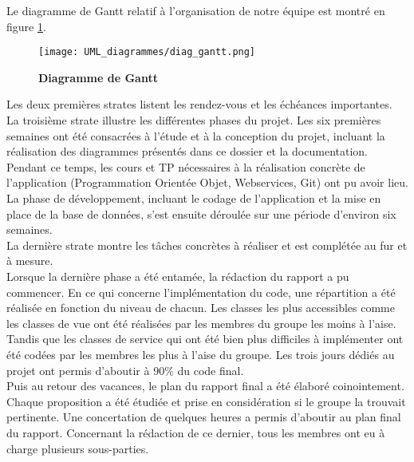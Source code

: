 \documentclass[11pt]{article}
\begin{document}
\bigbreak

Le diagramme de Gantt relatif à l'organisation de notre équipe est montré en figure \ref{UML_gantt}.\\


\begin{figure}[H]
    \caption{\textbf{Diagramme de Gantt}}
    \label{UML_gantt}
    \centering
    \texttt{[image: UML\_diagrammes/diag\_gantt.png]}
\end{figure}

Les deux premières strates listent les rendez-vous et les échéances importantes. \\

La troisième strate illustre les différentes phases du projet. Les six premières semaines ont été consacrées à l'étude et à la conception du projet, incluant la réalisation des diagrammes présentés dans ce dossier et la documentation. Pendant ce temps, les cours et TP nécessaires à la réalisation concrète de l'application (Programmation Orientée Objet, Webservices, Git) ont pu avoir lieu. La phase de développement, incluant le codage de l'application et la mise en place de la base de données, s'est ensuite déroulée sur une période d'environ six semaines. \\

La dernière strate montre les tâches concrètes à réaliser et est complétée au fur et à mesure.\\

Lorsque la dernière phase a été entamée, la rédaction du rapport a pu commencer. 
En ce qui concerne l’implémentation du code, une répartition a été réalisée en fonction du niveau de chacun. Les classes les plus accessibles comme les classes de vue ont été réalisées par les membres du groupe les moins à l’aise. Tandis que les classes de service qui ont été bien plus difficiles à implémenter ont été codées par les membres les plus à l’aise du groupe. Les trois jours dédiés au projet ont permis d’aboutir à 90\% du code final. \\

Puis au retour des vacances, le plan du rapport final a été élaboré coinointement. Chaque proposition a été étudiée et prise en considération si le groupe la trouvait pertinente. Une concertation de quelques heures a permis d’aboutir au plan final du rapport. Concernant la rédaction de ce dernier, tous les membres ont eu à charge plusieurs sous-parties.


\end{document}
